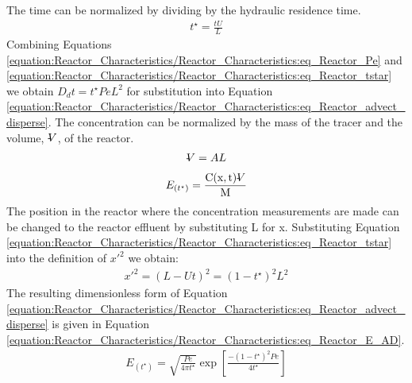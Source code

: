 \documentclass[letterpaper,10pt,english]{sphinxmanual}
\begin{document}
The time can be normalized by dividing by the hydraulic residence time.
\begin{equation}\label{equation:Reactor_Characteristics/Reactor_Characteristics:eq_Reactor_tstar}
\begin{split}t^{\star} =\frac{tU}{L}\end{split}
\end{equation}
Combining Equations \eqref{equation:Reactor_Characteristics/Reactor_Characteristics:eq_Reactor_Pe} and \eqref{equation:Reactor_Characteristics/Reactor_Characteristics:eq_Reactor_tstar} we obtain \(D_{d} t=t^{\star} PeL^{2}\) for substitution into Equation \eqref{equation:Reactor_Characteristics/Reactor_Characteristics:eq_Reactor_advect_disperse}. The concentration can be normalized by the mass of the tracer and the volume, \(\rlap{-} V\), of the reactor.
\begin{equation}\label{equation:Reactor_Characteristics/Reactor_Characteristics:Reactor_Characteristics/Reactor_Characteristics:5}
\begin{split}\rlap{-} V =AL\end{split}
\end{equation}\begin{equation}\label{equation:Reactor_Characteristics/Reactor_Characteristics:Reactor_Characteristics/Reactor_Characteristics:6}
\begin{split}E_{\left(t^{\star} \right)} =\frac{{\rm C(x,t)}\rlap{-} V }{{\rm M}}\end{split}
\end{equation}
The position in the reactor where the concentration measurements are made can be changed to the reactor effluent by substituting L for x. Substituting Equation \eqref{equation:Reactor_Characteristics/Reactor_Characteristics:eq_Reactor_tstar} into the definition of \(x'^{2}\) we obtain:
\begin{equation}\label{equation:Reactor_Characteristics/Reactor_Characteristics:Reactor_Characteristics/Reactor_Characteristics:7}
\begin{split}x'^{2} =\left(L-Ut\right)^{2} =\left(1-t^{\star} \right)^{2} L^{2}\end{split}
\end{equation}
The resulting dimensionless form of Equation \eqref{equation:Reactor_Characteristics/Reactor_Characteristics:eq_Reactor_advect_disperse} is given in Equation \eqref{equation:Reactor_Characteristics/Reactor_Characteristics:eq_Reactor_E_AD}.
\begin{equation}\label{equation:Reactor_Characteristics/Reactor_Characteristics:eq_Reactor_E_AD}
\begin{split}E_{\left(t^{\star} \right)} =\sqrt{\frac{Pe}{4\pi t^{\star} } } \exp \left[\frac{-\left(1-t^{\star} \right)^{2} Pe}{4t^{\star} } \right]\end{split}
\end{equation}
\end{document}
